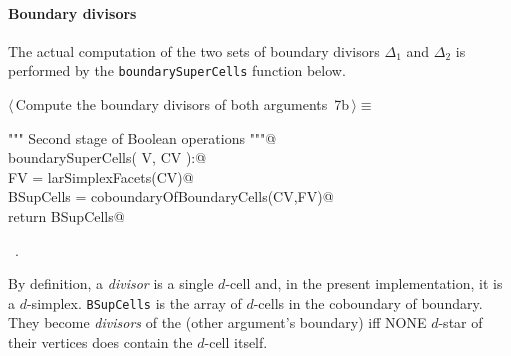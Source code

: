 \documentclass[11pt,oneside]{article}	%
\begin{document}
\paragraph{Boundary divisors}
The actual computation of the two sets of boundary divisors $\Delta_1$ and $\Delta_2$ is performed by the \texttt{boundarySuperCells} function below.

\begin{flushleft} \small \label{scrap13}
\protect{}$\langle\,$Compute the boundary divisors of both arguments\nobreak\ {\footnotesize 7b}$\,\rangle\equiv$
\vspace{-1ex}
\begin{list}{}{} \item
\mbox{}\verb@""" Second stage of Boolean operations """@\\
\mbox{}\verb@def boundarySuperCells( V, CV ):@\\
\mbox{}\verb@   FV = larSimplexFacets(CV)@\\
\mbox{}\verb@   BSupCells = coboundaryOfBoundaryCells(CV,FV)@\\
\mbox{}\verb@   return BSupCells@\\
\mbox{}\verb@@{\NWsep}
\end{list}
\vspace{-1ex}
\footnotesize\addtolength{\baselineskip}{-1ex}
\begin{list}{}{\setlength{\itemsep}{-\parsep}\setlength{\itemindent}{-\leftmargin}}
\item \NWtxtMacroRefIn\ .
\end{list}
\end{flushleft}


By definition, a \emph{divisor} is a single $d$-cell and, in the present implementation, it is a $d$-simplex. \texttt{BSupCells} is the array of $d$-cells in the coboundary of boundary. They become \emph{divisors} of the (other argument's boundary) iff NONE $d$-star of their vertices does contain the $d$-cell itself.
\end{document}
